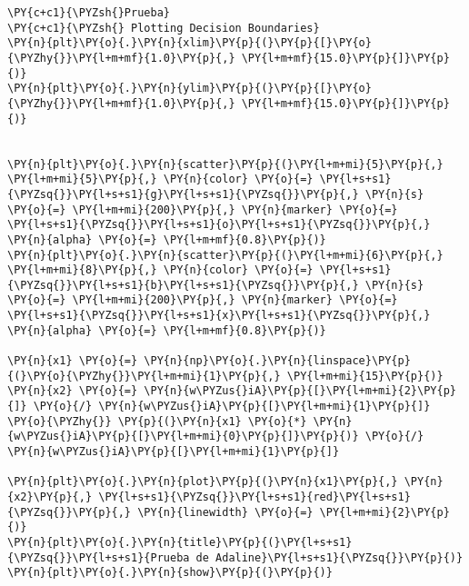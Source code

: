     \begin{tcolorbox}[breakable, size=fbox, boxrule=1pt, pad at break*=1mm,colback=cellbackground, colframe=cellborder]
\begin{Verbatim}[commandchars=\\\{\}]
\PY{c+c1}{\PYZsh{}Prueba}
\PY{c+c1}{\PYZsh{} Plotting Decision Boundaries}
\PY{n}{plt}\PY{o}{.}\PY{n}{xlim}\PY{p}{(}\PY{p}{[}\PY{o}{\PYZhy{}}\PY{l+m+mf}{1.0}\PY{p}{,} \PY{l+m+mf}{15.0}\PY{p}{]}\PY{p}{)}
\PY{n}{plt}\PY{o}{.}\PY{n}{ylim}\PY{p}{(}\PY{p}{[}\PY{o}{\PYZhy{}}\PY{l+m+mf}{1.0}\PY{p}{,} \PY{l+m+mf}{15.0}\PY{p}{]}\PY{p}{)}


\PY{n}{plt}\PY{o}{.}\PY{n}{scatter}\PY{p}{(}\PY{l+m+mi}{5}\PY{p}{,} \PY{l+m+mi}{5}\PY{p}{,} \PY{n}{color} \PY{o}{=} \PY{l+s+s1}{\PYZsq{}}\PY{l+s+s1}{g}\PY{l+s+s1}{\PYZsq{}}\PY{p}{,} \PY{n}{s} \PY{o}{=} \PY{l+m+mi}{200}\PY{p}{,} \PY{n}{marker} \PY{o}{=} \PY{l+s+s1}{\PYZsq{}}\PY{l+s+s1}{o}\PY{l+s+s1}{\PYZsq{}}\PY{p}{,} \PY{n}{alpha} \PY{o}{=} \PY{l+m+mf}{0.8}\PY{p}{)}
\PY{n}{plt}\PY{o}{.}\PY{n}{scatter}\PY{p}{(}\PY{l+m+mi}{6}\PY{p}{,} \PY{l+m+mi}{8}\PY{p}{,} \PY{n}{color} \PY{o}{=} \PY{l+s+s1}{\PYZsq{}}\PY{l+s+s1}{b}\PY{l+s+s1}{\PYZsq{}}\PY{p}{,} \PY{n}{s} \PY{o}{=} \PY{l+m+mi}{200}\PY{p}{,} \PY{n}{marker} \PY{o}{=} \PY{l+s+s1}{\PYZsq{}}\PY{l+s+s1}{x}\PY{l+s+s1}{\PYZsq{}}\PY{p}{,} \PY{n}{alpha} \PY{o}{=} \PY{l+m+mf}{0.8}\PY{p}{)}

\PY{n}{x1} \PY{o}{=} \PY{n}{np}\PY{o}{.}\PY{n}{linspace}\PY{p}{(}\PY{o}{\PYZhy{}}\PY{l+m+mi}{1}\PY{p}{,} \PY{l+m+mi}{15}\PY{p}{)}
\PY{n}{x2} \PY{o}{=} \PY{n}{w\PYZus{}iA}\PY{p}{[}\PY{l+m+mi}{2}\PY{p}{]} \PY{o}{/} \PY{n}{w\PYZus{}iA}\PY{p}{[}\PY{l+m+mi}{1}\PY{p}{]} \PY{o}{\PYZhy{}} \PY{p}{(}\PY{n}{x1} \PY{o}{*} \PY{n}{w\PYZus{}iA}\PY{p}{[}\PY{l+m+mi}{0}\PY{p}{]}\PY{p}{)} \PY{o}{/} \PY{n}{w\PYZus{}iA}\PY{p}{[}\PY{l+m+mi}{1}\PY{p}{]}

\PY{n}{plt}\PY{o}{.}\PY{n}{plot}\PY{p}{(}\PY{n}{x1}\PY{p}{,} \PY{n}{x2}\PY{p}{,} \PY{l+s+s1}{\PYZsq{}}\PY{l+s+s1}{red}\PY{l+s+s1}{\PYZsq{}}\PY{p}{,} \PY{n}{linewidth} \PY{o}{=} \PY{l+m+mi}{2}\PY{p}{)}
\PY{n}{plt}\PY{o}{.}\PY{n}{title}\PY{p}{(}\PY{l+s+s1}{\PYZsq{}}\PY{l+s+s1}{Prueba de Adaline}\PY{l+s+s1}{\PYZsq{}}\PY{p}{)}
\PY{n}{plt}\PY{o}{.}\PY{n}{show}\PY{p}{(}\PY{p}{)}
\end{Verbatim}
\end{tcolorbox}

    \begin{center}
    \end{center}
    { \hspace*{\fill} \\}
    

